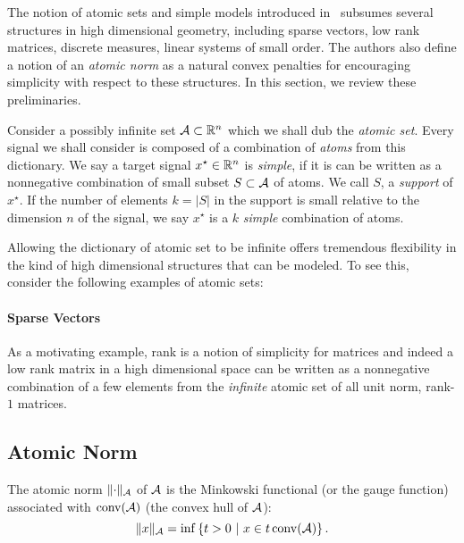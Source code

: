 The notion of atomic sets and simple models introduced in~\cite{crpw} subsumes
several structures in high dimensional geometry, including sparse
vectors, low rank matrices, discrete measures, linear systems of small order.
The authors also define a notion of an \emph{atomic norm} as a natural convex
penalties for encouraging simplicity with respect to these structures. In this
section, we review these preliminaries.

Consider a possibly infinite set $\mathcal{A} \subset \mathbb{R}^n$ which we shall dub the
\emph{atomic set}. Every signal we shall consider is composed of a combination
of \emph{atoms} from this dictionary. We say a target signal $x^\star \in \mathbb{R}^n$
is \emph{simple}, if it is can be written as a nonnegative combination of small
subset $S \subset \mathcal{A}$ of atoms. We call $S$, a \emph{support} of $x^\star$. If
the number of elements $k = |S|$ in the support is small relative to the
dimension $n$ of the signal, we say $x^\star$ is a $k$ \emph{simple} combination
of atoms.

Allowing the dictionary of atomic set to be infinite offers tremendous
flexibility in the kind of high dimensional structures that can be modeled. To
see this, consider the following examples of atomic sets:

\paragraph{Sparse Vectors} 

As a
motivating example, rank is a notion of simplicity for matrices and indeed a low
rank matrix in a high dimensional space can be written as a nonnegative
combination of a few elements from the \emph{infinite} atomic set of all unit
norm, rank-$1$ matrices.\\


\subsection{Atomic Norm}

\begin{definition}
The atomic norm $\lVert\cdot\rVert_{\mathcal{A}}$ of $\mathcal{A}$ is the Minkowski functional (or the
gauge function) associated with $\operatorname{conv}(\mathcal{A})$ (the convex hull of $\mathcal{A}$):
\begin{equation}
	\label{defatnorm} \lVert x\rVert_{\mathcal{A}} = \inf\left\{t > 0 ~\middle|~ x \in t \operatorname{conv}(\mathcal{A}) \right\}. 
\end{equation}
\end{definition}

